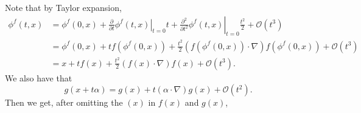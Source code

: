 Note that by Taylor expansion,
\begin{equation}
  \begin{aligned}
    \phi^f(t,x) & = \phi^f(0,x) + \left. \frac{\partial}{\partial t} \phi^f(t,x) \right|_{t=0} t + \left. \frac{\partial^2}{\partial t^2} \phi^f(t,x) \right|_{t=0} \frac{t^2}{2} + \mathcal O(t^3) \\
                & = \phi^f(0,x) +  t f(\phi^f(0,x)) + \frac{t^2}{2} \left( f(\phi^f(0,x)) \cdot \nabla \right) f(\phi^f(0,x))  + \mathcal O(t^3)                                                    \\
                & = x +  t f(x) + \frac{t^2}{2}  \left(f(x) \cdot \nabla \right) f(x)  + \mathcal O(t^3).
  \end{aligned}
\end{equation}
We also have that
\begin{equation}
  g(x+t \alpha) = g(x) + t (\alpha \cdot \nabla) g(x) + \mathcal O(t^2).
\end{equation}
Then we get, after omitting the $(x)$ in $f(x)$ and $g(x)$,
\small

